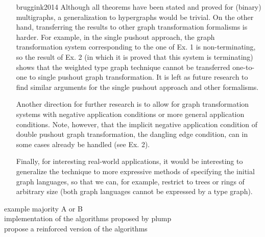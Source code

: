 
\begin{itemize}
    \item[bruggink2014]Although all theorems have been stated and proved for (binary) multigraphs, a generalization to hypergraphs would be trivial. On the other hand, transferring the results to other graph transformation formalisms is harder. For example, in the single pushout approach, the graph transformation system corresponding to the one of Ex. 1 is non-terminating, so the result of Ex. 2 (in which it is proved that this system is terminating) shows that the weighted type graph technique cannot be transferred one-to-one to single pushout graph transformation. It is left as future research to find similar arguments for the single pushout approach and other formalisms.
    
    Another direction for further research is to allow for graph transformation systems with negative application conditions or more general application conditions. Note, however, that the implicit negative application condition of double pushout graph transformation, the dangling edge condition, can in some cases already be handled (see Ex. 2). 
    
    Finally, for interesting real-world applications, it would be interesting to generalize the technique to more expressive methods of specifying the initial graph languages, so that we can, for example, restrict to trees or rings of arbitrary size (both graph languages cannot be expressed by a type graph). 
\end{itemize}

\begin{idea}
    example majority A or B\\
    implementation of the algorithms proposed by plump\\
    propose a reinforced version of the algorithms\\
\end{idea}
